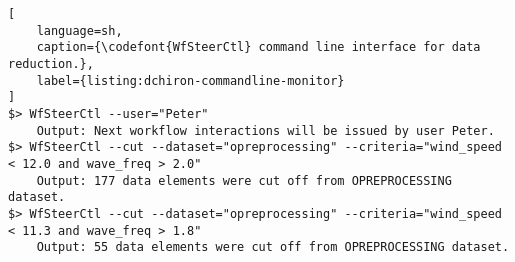 
\noindent\begin{minipage}[t]{1.0\linewidth}

\begin{lstlisting}[
    language=sh,
    caption={\codefont{WfSteerCtl} command line interface for data reduction.},
    label={listing:dchiron-commandline-monitor}
]
$> WfSteerCtl --user="Peter"
    Output: Next workflow interactions will be issued by user Peter.
$> WfSteerCtl --cut --dataset="opreprocessing" --criteria="wind_speed < 12.0 and wave_freq > 2.0"
    Output: 177 data elements were cut off from OPREPROCESSING dataset.
$> WfSteerCtl --cut --dataset="opreprocessing" --criteria="wind_speed < 11.3 and wave_freq > 1.8"
    Output: 55 data elements were cut off from OPREPROCESSING dataset.

\end{lstlisting}
\end{minipage}
